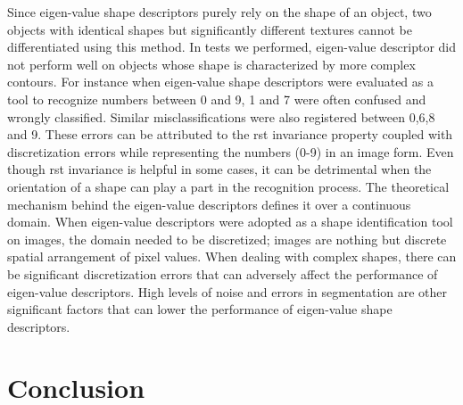 \documentclass {udthesis}
\begin{document}
Since eigen-value shape descriptors purely rely on the shape of an object, two objects with identical shapes but significantly different textures cannot be differentiated using this method. In tests we performed, eigen-value descriptor did not perform well on objects whose shape is characterized by more complex contours. For instance when eigen-value shape descriptors were evaluated as a tool to recognize numbers between 0 and 9, 1 and 7 were often confused and wrongly classified. Similar misclassifications were also registered between 0,6,8 and 9. These errors can be attributed to the \gls{rst} invariance property coupled with discretization errors while representing the numbers (0-9) in an image form. Even though \gls{rst} invariance is helpful in some cases, it can be detrimental when the orientation of a shape can play a part in the recognition process. The theoretical mechanism behind the eigen-value descriptors defines it over a continuous domain. When eigen-value descriptors were adopted as a shape 
identification tool on images, the domain needed to be discretized; images are nothing but discrete spatial arrangement of pixel values. When dealing with complex shapes, there can be significant discretization errors that can adversely affect the performance of eigen-value descriptors. High levels of noise and errors in segmentation are other significant factors that can lower the performance of eigen-value shape descriptors.


\section{Conclusion}
\end{document}
